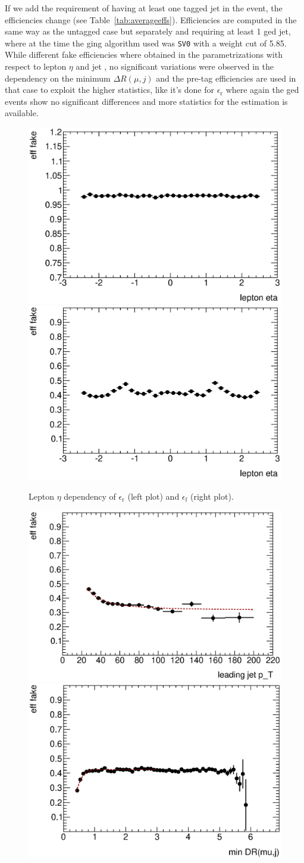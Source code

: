 If we add the requirement of having at least one tagged jet in 
the event, the efficiencies change (see Table~\ref{tab:averageeffs}). 
Efficiencies are computed in the same way as the untagged case 
but separately and requiring at least 1 \btag ged jet, where at the
time the \btag ging algorithm used was \texttt{SV0} with a weight cut 
of 5.85. While different fake efficiencies where obtained in the
parametrizations with respect to lepton $\eta$ and jet \pt, 
no significant variations were observed in the dependency on
the minimum $\Delta R(\mu,j)$ and the pre-tag efficiencies are 
used in that case to exploit the higher statistics, like it's done for 
$\epsilon_\mathrm{r}$ where again the \btag ged events show 
no significant differences and more statistics 
for the estimation is available.

\begin{figure}\centering
\includegraphics[width=.45\textwidth]{appendices/figures/mujets_mmB/fit_h_lep_eta_muon_real_untagged}\includegraphics[width=.45\textwidth]{appendices/figures/mujets_mmB/fit_h_lep_eta_muon_fake_untagged}
\caption{Lepton $\eta$ dependency of $\epsilon_\mathrm{r}$ (left plot) and $\epsilon_\mathrm{f}$ (right plot).}\label{fig:etaDep}
\end{figure} \begin{figure}\centering
\includegraphics[width=.45\textwidth]{appendices/figures/mujets_mmB/fit_h_lep_LJpT_rb_muon_fake_untagged}\includegraphics[width=.45\textwidth]{appendices/figures/mujets_mmB/fit_h_lep_minDR_muon_fake_untagged}

\end{figure}
